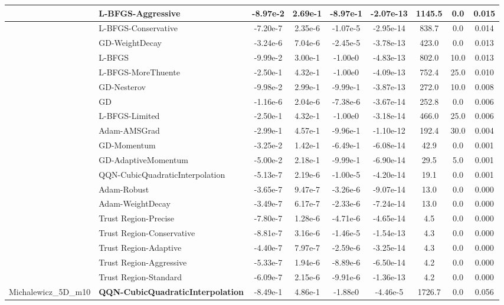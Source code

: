 \documentclass{article}
\begin{document}
\begin{longtable}{|l|l|c|c|c|c|c|c|c|}
\hline
 & L-BFGS-Aggressive & -8.97e-2 & 2.69e-1 & -8.97e-1 & -2.07e-13 & 1145.5 & 0.0 & 0.015 \\
\hline
 & L-BFGS-Conservative & -7.20e-7 & 2.35e-6 & -1.07e-5 & -2.95e-14 & 838.7 & 0.0 & 0.014 \\
\hline
 & GD-WeightDecay & -3.24e-6 & 7.04e-6 & -2.45e-5 & -3.78e-13 & 423.0 & 0.0 & 0.013 \\
\hline
 & L-BFGS & -9.99e-2 & 3.00e-1 & -1.00e0 & -4.83e-13 & 802.0 & 10.0 & 0.013 \\
\hline
 & L-BFGS-MoreThuente & -2.50e-1 & 4.32e-1 & -1.00e0 & -4.09e-13 & 752.4 & 25.0 & 0.010 \\
\hline
 & GD-Nesterov & -9.98e-2 & 2.99e-1 & -9.99e-1 & -3.87e-13 & 272.0 & 10.0 & 0.008 \\
\hline
 & GD & -1.16e-6 & 2.04e-6 & -7.38e-6 & -3.67e-14 & 252.8 & 0.0 & 0.006 \\
\hline
 & L-BFGS-Limited & -2.50e-1 & 4.32e-1 & -1.00e0 & -3.18e-14 & 466.0 & 25.0 & 0.006 \\
\hline
 & Adam-AMSGrad & -2.99e-1 & 4.57e-1 & -9.96e-1 & -1.10e-12 & 192.4 & 30.0 & 0.004 \\
\hline
 & GD-Momentum & -3.25e-2 & 1.42e-1 & -6.49e-1 & -6.08e-14 & 42.9 & 0.0 & 0.001 \\
\hline
 & GD-AdaptiveMomentum & -5.00e-2 & 2.18e-1 & -9.99e-1 & -6.90e-14 & 29.5 & 5.0 & 0.001 \\
\hline
 & QQN-CubicQuadraticInterpolation & -5.13e-7 & 2.19e-6 & -1.00e-5 & -4.20e-14 & 19.1 & 0.0 & 0.001 \\
\hline
 & Adam-Robust & -3.65e-7 & 9.47e-7 & -3.26e-6 & -9.07e-14 & 13.0 & 0.0 & 0.000 \\
\hline
 & Adam-WeightDecay & -3.49e-7 & 6.17e-7 & -2.33e-6 & -7.24e-14 & 13.0 & 0.0 & 0.000 \\
\hline
 & Trust Region-Precise & -7.80e-7 & 1.28e-6 & -4.71e-6 & -4.65e-14 & 4.5 & 0.0 & 0.000 \\
\hline
 & Trust Region-Conservative & -8.81e-7 & 3.16e-6 & -1.46e-5 & -1.54e-13 & 4.3 & 0.0 & 0.000 \\
\hline
 & Trust Region-Adaptive & -4.40e-7 & 7.97e-7 & -2.59e-6 & -3.25e-14 & 4.3 & 0.0 & 0.000 \\
\hline
 & Trust Region-Aggressive & -5.33e-7 & 1.94e-6 & -8.89e-6 & -6.50e-14 & 4.2 & 0.0 & 0.000 \\
\hline
 & Trust Region-Standard & -6.09e-7 & 2.15e-6 & -9.91e-6 & -1.36e-13 & 4.2 & 0.0 & 0.000 \\
Michalewicz\_5D\_m10 & \textbf{QQN-CubicQuadraticInterpolation} & -8.49e-1 & 4.86e-1 & -1.88e0 & -4.46e-5 & 1726.7 & 0.0 & 0.056 \\

\end{longtable}
\end{document}
